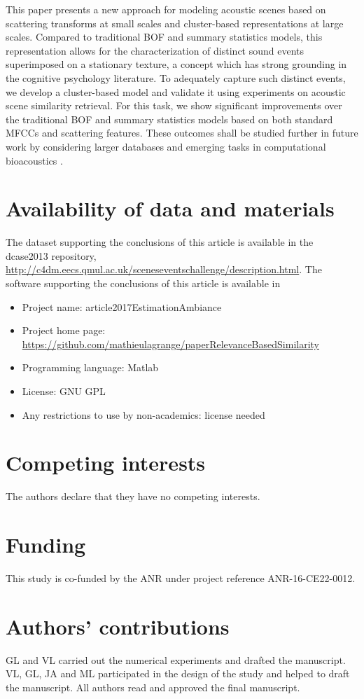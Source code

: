 \documentclass[smallextended]{svjour3}
\begin{document}
This paper presents a new approach for modeling acoustic scenes based on scattering transforms at small scales and cluster-based representations at large scales. Compared to traditional BOF and summary statistics models, this representation allows for the characterization of distinct sound events superimposed on a stationary texture, a concept which has strong grounding in the cognitive psychology literature. To adequately capture such distinct events, we develop a cluster-based model and validate it using experiments on acoustic scene similarity retrieval. For this task, we show significant improvements over the traditional BOF and summary statistics models based on both standard MFCCs and scattering features.
These outcomes shall be studied further in future work by considering larger databases and emerging tasks in computational bioacoustics \cite{wimmer2013sampling}.


\section*{Availability of data and materials}
The dataset supporting the conclusions of this article is available in the dcase2013 repository,  \sloppy \url{http://c4dm.eecs.qmul.ac.uk/sceneseventschallenge/description.html}.
The software supporting the conclusions of this article is available in
\begin{itemize}
\item Project name: article2017EstimationAmbiance
\item \sloppy Project home page: \url{https://github.com/mathieulagrange/paperRelevanceBasedSimilarity}
\item Programming language: Matlab
\item License: GNU GPL
\item Any restrictions to use by non-academics: license needed
\end{itemize}


\section*{Competing interests}
The authors declare that they have no competing interests.

\section*{Funding}
This study is co-funded by the ANR under project reference ANR-16-CE22-0012.

\section*{Authors' contributions}
GL and VL carried out the numerical experiments and drafted the manuscript. VL, GL, JA and ML participated in the design of the study and helped to draft the manuscript.
All authors read and approved the final manuscript.
\end{document}
